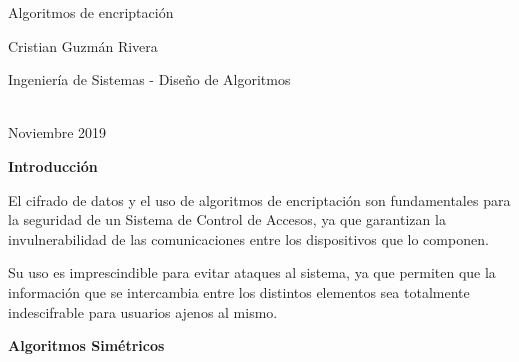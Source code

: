 \documentclass[12pt]{article}
\begin{document}
\begin{Center}
Algoritmos de encriptación
\end{Center}\par


\vspace{\baselineskip}
\begin{Center}
Cristian Guzmán Rivera
\end{Center}\par


\vspace{\baselineskip}
\begin{Center}
Ingeniería de Sistemas - Diseño de Algoritmos
\end{Center}\par

\begin{Center}
\\
Noviembre 2019
\end{Center}\par


\vspace{\baselineskip}

\vspace{\baselineskip}
\begin{Center}
\textbf{Introducción}
\end{Center}\par


\vspace{\baselineskip}
\begin{justify}
El cifrado de datos y el uso de algoritmos de encriptación son fundamentales para la seguridad de un Sistema de Control de Accesos, ya que garantizan la invulnerabilidad de las comunicaciones entre los dispositivos que lo componen.
\end{justify}\par


\vspace{\baselineskip}
\begin{justify}
Su uso es imprescindible para evitar ataques al sistema, ya que permiten que la información que se intercambia entre los distintos elementos sea totalmente indescifrable para usuarios ajenos al mismo.
\end{justify}\par


\vspace{\baselineskip}
\begin{Center}
\textbf{Algoritmos Simétricos}
\end{Center}\par
\end{document}
